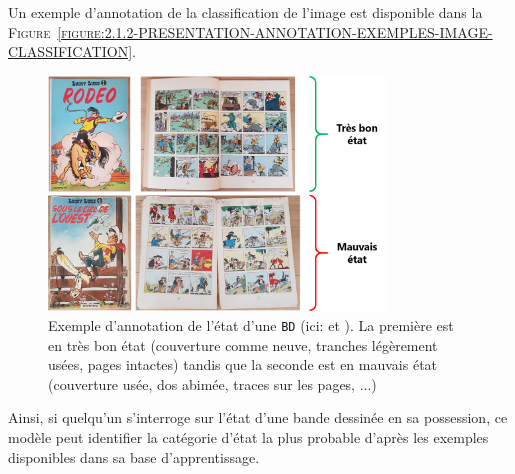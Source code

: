 			Un exemple d'annotation de la classification de l'image est disponible dans la \textsc{Figure~\ref{figure:2.1.2-PRESENTATION-ANNOTATION-EXEMPLES-IMAGE-CLASSIFICATION}}.
			\begin{leftBarExamples}
				\begin{figure}[H]
					\centering
					\includegraphics[width=0.80\textwidth]{figures/etatdelart-morris-1950-lucky-luke-2-1952-lucky-luke-4}
					\caption{
						Exemple d'annotation de l'état d'une \texttt{BD} (ici: \cite{morris-goscinny:1950:rodeo} et \cite{morris-goscinny:1952:sous-ciel-ouest}).
						La première est en très bon état (couverture comme neuve, tranches légèrement usées, pages intactes) tandis que la seconde est en mauvais état (couverture usée, dos abimée, traces sur les pages, ...)
					}
					\label{figure:2.1.2.B-PRESENTATION-ANNOTATION-EXEMPLES-CLASSIFICATION}
				\end{figure}
			\end{leftBarExamples}
			
			Ainsi, si quelqu'un s'interroge sur l'état d'une bande dessinée en sa possession, ce modèle peut identifier la catégorie d'état la plus probable d'après les exemples disponibles dans sa base d'apprentissage.
			

